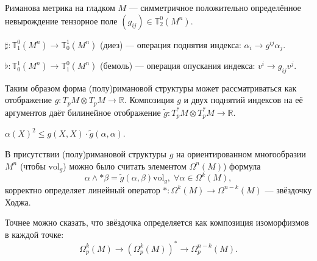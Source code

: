  \begin{to_def}
 	Риманова метрика на гладком $M$ --- симметричное положительно определённое невырождение тензорное поле $(g_{i j}) \in \mathbb{T}_2^0(M^n)$. 
 \end{to_def}

 \begin{to_def}
 	$\sharp \colon \mathbb{T}_1^0(M^n) \rightarrow \mathbb{T}_0^1(M^n)$ (диез) --- операция поднятия индекса: $\alpha_i \rightarrow g^{i j} \alpha_j$.
 \end{to_def}

 \begin{to_def}
 	$\flat \colon \mathbb{T}^1_0(M^n) \rightarrow \mathbb{T}^0_1(M^n)$ (бемоль) --- операция опускания индекса: $v^i \rightarrow g_{i j}v^j$.
 \end{to_def}

Таким образом форма (полу)римановой структуры может рассматриваться как отображение $g\colon T_pM \otimes T_pM \rightarrow \mathbb{R}$.
Композиция $g$ и двух поднятий индексов на её аргументов даёт билинейное отображение $\tilde{g}\colon T_p^*M \otimes T_p^*M \rightarrow \mathbb{R}$. 

\begin{to_tas}
	$\alpha(X)^2 \leq g(X,X) \cdot \tilde{g} (\alpha,\alpha)$.
\end{to_tas}

\begin{to_def}
	В присутствии (полу)римановой структуры $g$ на ориентированном многообразии $M^n$ (чтобы $\text{vol}_{g}$) можно было считать элементом $\Omega^n(M)$) формула 
	\begin{equation*}
		\alpha \wedge *\beta = \tilde{g}(\alpha,\beta) \text{vol}_g, \; \forall \alpha \in \Omega^k(M),	
	\end{equation*}
	корректно определяет линейный оператор $*\colon \Omega^k(M) \rightarrow \Omega^{n-k}(M)$ --- звёздочку Ходжа.

	Точнее можно сказать, что звёздочка определяется как композиция изоморфизмов в каждой точке:
	\begin{equation*}
		\Omega_p^k(M) \longrightarrow \left(\Omega_p^k(M)\right)^* \longrightarrow \Omega_p^{n-k}(M).
	\end{equation*}
\end{to_def}
